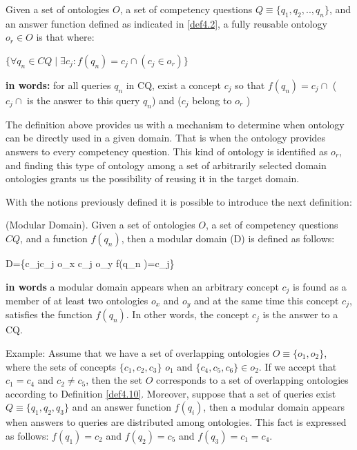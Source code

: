 \begin{defn}\label{def4.3}
	
	Given a set of ontologies $O$, a set of competency questions $Q \equiv \{q_{1},q_{2},..,q_{n}\}$, and an answer function  defined as indicated in \ref{def4.2}, a fully reusable ontology $o_{r} \in O$ is that where:
	
	$\{\forall q_{n} \in CQ \mid  \exists c_j : f(q_{n} )=c_j \cap (c_j \in o_r )\}$
	
	\textbf{in words:} for all queries $q_{n}$ in CQ, exist a concept $c_j$ so that $f(q_{n} )=c_j∩$ ($c_j∩$ is the answer to this query $q_{n}$) and ($c_j$ belong to  $o_r$ )
\end{defn}


The definition above provides us with a mechanism to determine when ontology can be directly used in a given domain. That is when the ontology provides answers to every competency question. This kind of ontology is identified as $o_{r}$, and finding this type of ontology among a set of arbitrarily selected domain ontologies grants us the possibility of reusing it in the target domain. 

With the notions previously defined it is possible to introduce the next definition:

\begin{defn}\label{def4.4}
	(Modular Domain). Given a set of ontologies $O$, a set of competency questions $CQ$, and a function  $f(q_{n} )$, then a modular domain (D) is defined as follows:
	
	
	D=\{c_j\mid c_j \in o_x  \cap c_j \in o_y \cap f(q_{n} )=c_j\}
	
	\textbf{in words} a modular domain appears when an arbitrary concept $c_j$ is found as a member of at least two ontologies $o_x$ and $o_y$ and at the same time this concept $c_j$, satisfies the function $f(q_{n} )$. In other words, the concept $c_j$ is the answer to a CQ. 
\end{defn}


Example:  
\cbstart Assume that we have a set of overlapping ontologies $O \equiv \{o_{1},o_{2}\}$, where the sets of concepts $\{c_{1},c_{2},c_{3}\}$ \in $o_{1}$ and $\{c_{4},c_{5},c_{6}\} \in o_{2}$. If we accept that  $c_{1}=c_{4}$ and $c_{2} \neq c_{5}$, then the set  $O$ corresponds to a set of overlapping ontologies according to Definition \ref{def4.10}. Moreover, suppose that a set of queries exist $Q \equiv \{q_1,q_2,q_3 \}$ and an answer function $f(q_i )$, then a modular domain appears when answers to queries are distributed among ontologies. This fact is expressed as follows: $f(q_1 )=c_2$ and $f(q_2 )=c_5$ and $f(q_3 )=c_1=c_4$. \cbend

